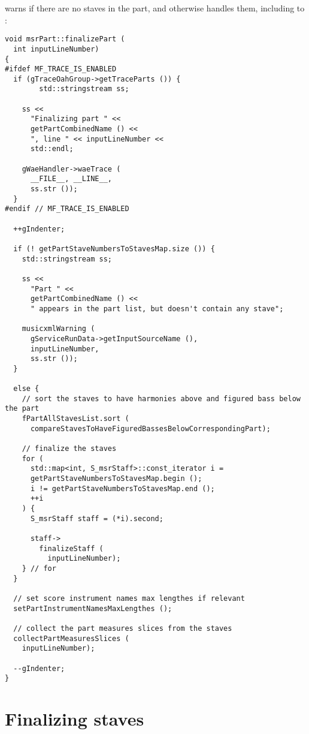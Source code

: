 warns if there are no staves in the part, and otherwise handles them, including \cascading to :
\begin{lstlisting}[language=CPlusPlus]
void msrPart::finalizePart (
  int inputLineNumber)
{
#ifdef MF_TRACE_IS_ENABLED
  if (gTraceOahGroup->getTraceParts ()) {
		std::stringstream ss;

    ss <<
      "Finalizing part " <<
      getPartCombinedName () <<
      ", line " << inputLineNumber <<
      std::endl;

    gWaeHandler->waeTrace (
      __FILE__, __LINE__,
      ss.str ());
  }
#endif // MF_TRACE_IS_ENABLED

  ++gIndenter;

  if (! getPartStaveNumbersToStavesMap.size ()) {
    std::stringstream ss;

    ss <<
      "Part " <<
      getPartCombinedName () <<
      " appears in the part list, but doesn't contain any stave";

    musicxmlWarning (
      gServiceRunData->getInputSourceName (),
      inputLineNumber,
      ss.str ());
  }

  else {
    // sort the staves to have harmonies above and figured bass below the part
    fPartAllStavesList.sort (
      compareStavesToHaveFiguredBassesBelowCorrespondingPart);

    // finalize the staves
    for (
      std::map<int, S_msrStaff>::const_iterator i =
      getPartStaveNumbersToStavesMap.begin ();
      i != getPartStaveNumbersToStavesMap.end ();
      ++i
    ) {
      S_msrStaff staff = (*i).second;

      staff->
        finalizeStaff (
          inputLineNumber);
    } // for
  }

  // set score instrument names max lengthes if relevant
  setPartInstrumentNamesMaxLengthes ();

  // collect the part measures slices from the staves
  collectPartMeasuresSlices (
    inputLineNumber);

  --gIndenter;
}
\end{lstlisting}



\section{Finalizing staves}


